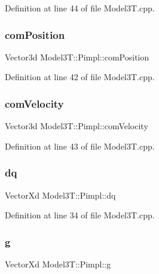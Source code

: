 Definition at line 44 of file Model3\+T.\+cpp.

\hypertarget{structModel3T_1_1Pimpl_a61412bd640cbf9f3bffa791261123328}{}\label{structModel3T_1_1Pimpl_a61412bd640cbf9f3bffa791261123328} 
\subsubsection{\texorpdfstring{com\+Position}{comPosition}}
{\footnotesize\ttfamily Vector3d Model3\+T\+::\+Pimpl\+::com\+Position}



Definition at line 42 of file Model3\+T.\+cpp.

\hypertarget{structModel3T_1_1Pimpl_a80c7336da4224ba5105c067870e818bb}{}\label{structModel3T_1_1Pimpl_a80c7336da4224ba5105c067870e818bb} 
\subsubsection{\texorpdfstring{com\+Velocity}{comVelocity}}
{\footnotesize\ttfamily Vector3d Model3\+T\+::\+Pimpl\+::com\+Velocity}



Definition at line 43 of file Model3\+T.\+cpp.

\hypertarget{structModel3T_1_1Pimpl_a38a7e4a5908517ee2bd63c75eb570f63}{}\label{structModel3T_1_1Pimpl_a38a7e4a5908517ee2bd63c75eb570f63} 
\subsubsection{\texorpdfstring{dq}{dq}}
{\footnotesize\ttfamily Vector\+Xd Model3\+T\+::\+Pimpl\+::dq}



Definition at line 34 of file Model3\+T.\+cpp.

\hypertarget{structModel3T_1_1Pimpl_a8a6bd5458703a775e213e47794a59d7d}{}\label{structModel3T_1_1Pimpl_a8a6bd5458703a775e213e47794a59d7d} 
\subsubsection{\texorpdfstring{g}{g}}
{\footnotesize\ttfamily Vector\+Xd Model3\+T\+::\+Pimpl\+::g}




